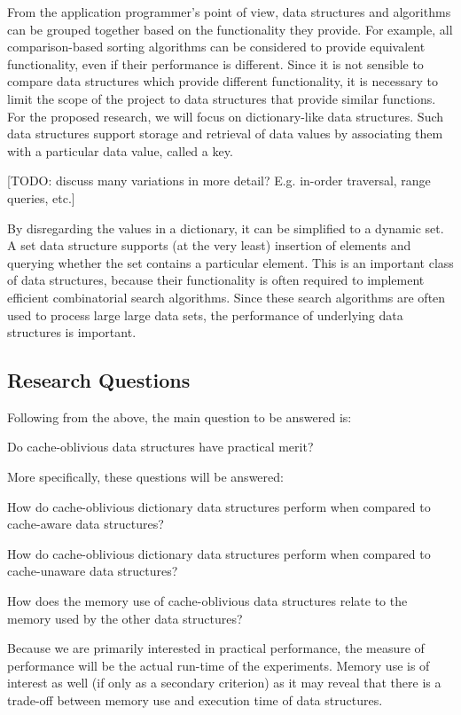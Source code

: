 \documentclass{acm_proc_article-sp}
\begin{document}
From the application programmer's point of view, data structures and algorithms can be grouped together based on the functionality they provide. For example, all comparison-based sorting algorithms can be considered to provide equivalent functionality, even if their performance is different. Since it is not sensible to compare data structures which provide different functionality, it is necessary to limit the scope of the project to data structures that provide similar functions. For the proposed research, we will focus on dictionary-like data structures. Such data structures support storage and retrieval of data values by associating them with a particular data value, called a key.

[TODO: discuss many variations in more detail? E.g. in-order traversal, range queries, etc.]

By disregarding the values in a dictionary, it can be simplified to a dynamic set. A set data structure supports (at the very least) insertion of elements and querying whether the set contains a particular element. This is an important class of data structures, because their functionality is often required to implement efficient combinatorial search algorithms. Since these search algorithms are often used to process large large data sets, the performance of underlying data structures is important.

\subsection{Research Questions}
Following from the above, the main question to be answered is:
\begin{list}{}{}
\item Do cache-oblivious data structures have practical merit?
\end{list}

More specifically, these questions will be answered:
\begin{list}{.}{}
\item How do cache-oblivious dictionary data structures perform when compared to cache-aware data structures?
\item How do cache-oblivious dictionary data structures perform when compared to cache-unaware data structures?
\item How does the memory use of cache-oblivious data structures relate to the memory used by the other data structures?
\end{list}
Because we are primarily interested in practical performance, the measure of performance will be the actual run-time of the experiments. Memory use is of interest as well (if only as a secondary criterion) as it may reveal that there is a trade-off between memory use and execution time of data structures.
\end{document}
